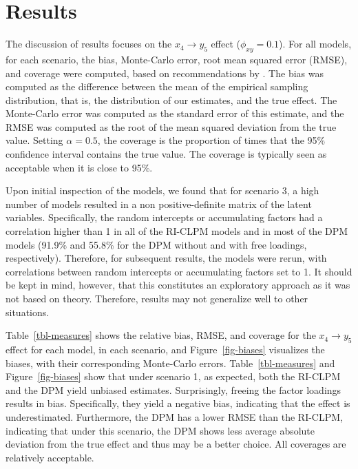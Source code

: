 \documentclass[
  a4paper,
  stu,
  floatsintext,
  donotrepeattitle]{apa7}
\begin{document}
\hypertarget{results}{%
\section{Results}\label{results}}

The discussion of results focuses on the \(x_4 \rightarrow y_5\) effect
(\(\phi_{xy} = 0.1\)). For all models, for each scenario, the bias,
Monte-Carlo error, root mean squared error (RMSE), and coverage were
computed, based on recommendations by \textcite{morris2019}. The bias
was computed as the difference between the mean of the empirical
sampling distribution, that is, the distribution of our estimates, and
the true effect. The Monte-Carlo error was computed as the standard
error of this estimate, and the RMSE was computed as the root of the
mean squared deviation from the true value. Setting \(\alpha = 0.5\),
the coverage is the proportion of times that the 95\% confidence
interval contains the true value. The coverage is typically seen as
acceptable when it is close to 95\%.

Upon initial inspection of the models, we found that for scenario 3, a
high number of models resulted in a non positive-definite matrix of the
latent variables. Specifically, the random intercepts or accumulating
factors had a correlation higher than 1 in all of the RI-CLPM models and
in most of the DPM models (91.9\% and 55.8\% for the DPM without and
with free loadings, respectively). Therefore, for subsequent results,
the models were rerun, with correlations between random intercepts or
accumulating factors set to 1. It should be kept in mind, however, that
this constitutes an exploratory approach as it was not based on theory.
Therefore, results may not generalize well to other situations.

Table~\ref{tbl-measures} shows the relative bias, RMSE, and coverage for
the \(x_4 \rightarrow y_5\) effect for each model, in each scenario, and
Figure~\ref{fig-biases} visualizes the biases, with their corresponding
Monte-Carlo errors. Table~\ref{tbl-measures} and Figure~\ref{fig-biases}
show that under scenario 1, as expected, both the RI-CLPM and the DPM
yield unbiased estimates. Surprisingly, freeing the factor loadings
results in bias. Specifically, they yield a negative bias, indicating
that the effect is underestimated. Furthermore, the DPM has a lower RMSE
than the RI-CLPM, indicating that under this scenario, the DPM shows
less average absolute deviation from the true effect and thus may be a
better choice. All coverages are relatively acceptable.
\end{document}
